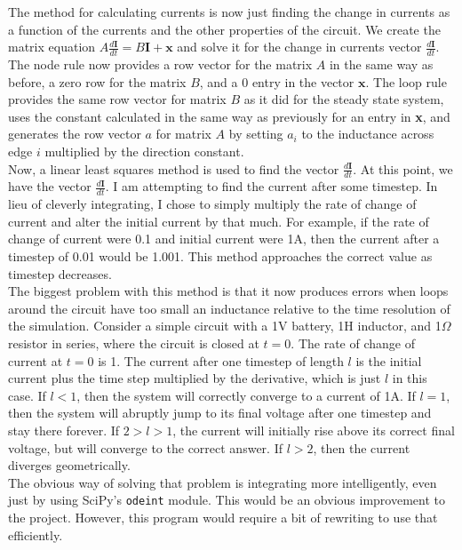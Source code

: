 \documentclass[11pt]{article}
\begin{document}
The method for calculating currents is now just finding the change in currents as a function of the currents and the other properties of the circuit. We create the matrix equation $A\frac{d\textbf{I}}{dt}=B\textbf{I} + \textbf{x}$ and solve it for the change in currents vector $\frac{d\textbf{I}}{dt}$.\\

The node rule now provides a row vector for the matrix $A$ in the same way as before, a zero row for the matrix $B$, and a 0 entry in the vector $\textbf{x}$. The loop rule provides the same row vector for matrix $B$ as it did for the steady state system, uses the constant calculated in the same way as previously for an entry in \textbf{x}, and generates the row vector $a$ for matrix $A$ by setting $a_i$ to the inductance across edge $i$ multiplied by the direction constant.\\

Now, a linear least squares method is used to find the vector $\frac{d\textbf{I}}{dt}$. At this point, we have the vector $\frac{d\textbf{I}}{dt}$. I am attempting to find the current after some timestep. In lieu of cleverly integrating, I chose to simply multiply the rate of change of current and alter the initial current by that much. For example, if the rate of change of current were 0.1 and initial current were 1A, then the current after a timestep of 0.01 would be 1.001. This method approaches the correct value as timestep decreases.\\

The biggest problem with this method is that it now produces errors when loops around the circuit have too small an inductance relative to the time resolution of the simulation. Consider a simple circuit with a 1V battery, 1H inductor, and 1$\Omega$ resistor in series, where the circuit is closed at $t=0$. The rate of change of current at $t=0$ is 1. The current after one timestep of length $l$ is the initial current plus the time step multiplied by the derivative, which is just $l$ in this case. If $l<1$, then the system will correctly converge to a current of 1A. If $l=1$, then the system will abruptly jump to its final voltage after one timestep and stay there forever. If $2>l>1$, the current will initially rise above its correct final voltage, but will converge to the correct answer. If $l>2$, then the current diverges geometrically.\\

The obvious way of solving that problem is integrating more intelligently, even just by using SciPy's \texttt{odeint} module. This would be an obvious improvement to the project. However, this program would require a bit of rewriting to use that efficiently.
\end{document}
